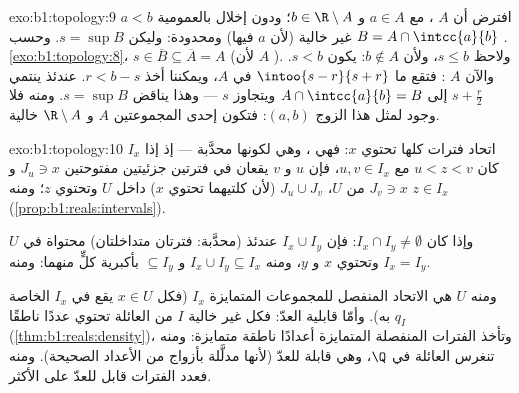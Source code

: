 \begin{solution}{exo:b1:topology:9}
افترض أن $A$  ، مع $a \in A$ و $b \in \R
\setminus A$؛ ودون إخلال بالعمومية $a < b$.  $B = A \cap
\intcc{a}{b}$ غير خالية (لأن $a$ فيها) ومحدودة: وليكن $s = \sup B$. وحسب
\cref{exo:b1:topology:8}، $s \in \overline B \subseteq \overline A =
A$ (لأن $A$ ). ولاحظ $s \leq b$، ولأن $b \notin A$: يكون $s < b$.
والآن $A$ : فتقع  ما $\intoo{s - r}{s + r}$ في $A$،
ويمكننا أخذ $r < b - s$. عندئذ ينتمي $s + \frac{r}{2}$ إلى $A
\cap \intcc{a}{b} = B$ ويتجاوز $s$ --- وهذا يناقض $s = \sup
B$. ومنه فلا وجود لمثل هذا الزوج $(a, b)$: فتكون إحدى المجموعتين $A$ و $\R \setminus A$
خالية.
\end{solution}

\begin{solution}{exo:b1:topology:10}
 $I_x$ اتحاد فترات  كلها تحتوي $x$: فهي ،
وهي  لكونها محدَّبة --- إذ إذا كان $u < z < v$ مع $u, v \in
I_x$، فإن $u$ و $v$ يقعان في فترتين جزئيتين مفتوحتين $J_u \ni x$ و $J_v \ni
x$ من $U$،  $J_u \cup J_v$  (لأن كلتيهما تحتوي $x$)
داخل $U$ وتحتوي $z$؛ ومنه $z \in I_x$
(\cref{prop:b1:reals:intervals}).

وإذا كان $I_x \cap I_y \neq \emptyset$: فإن $I_x \cup I_y$ عندئذ 
 (محدَّبة: فترتان متداخلتان) محتواة في $U$
وتحتوي $x$ و $y$، ومنه $I_x \cup I_y \subseteq I_x$ و
$\subseteq I_y$ بأكبرية كلٍّ منهما: ومنه $I_x = I_y$.

ومنه  $U$ هي الاتحاد المنفصل للمجموعات المتمايزة $I_x$ (فكل $x \in
U$ يقع في $I_x$ الخاصة به). وأمّا قابلية العدّ: فكل   غير خالية
$I$ من العائلة تحتوي عددًا ناطقًا $q_I$
(\cref{thm:b1:reals:density})، وتأخذ الفترات المنفصلة المتمايزة أعدادًا ناطقة
متمايزة: ومنه تنغرس العائلة في $\Q$، وهي قابلة للعدّ
(لأنها مدلَّلة بأزواج من الأعداد الصحيحة). ومنه فعدد الفترات قابل للعدّ
على الأكثر.
\end{solution}

